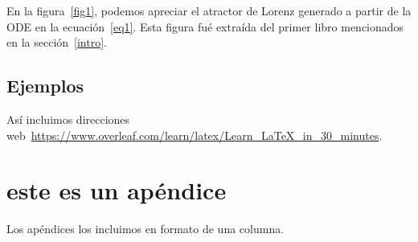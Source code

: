 \documentclass[aps,prl,twocolumn,groupedaddress]{revtex4-2}
\begin{document}
En la figura~\ref{fig1}, podemos apreciar el atractor de Lorenz generado a partir de la ODE en la ecuación~\ref{eq1}.
Esta figura fué extraída del primer libro mencionados en la sección~\ref{intro}.

\subsection{
\label{ejemplos}
Ejemplos
}

Así incluimos direcciones web~\url{https://www.overleaf.com/learn/latex/Learn_LaTeX_in_30_minutes}.



\onecolumngrid
\appendix

\section{este es un apéndice}
\label{appA}

Los apéndices los incluimos en formato de una columna.
\end{document}
